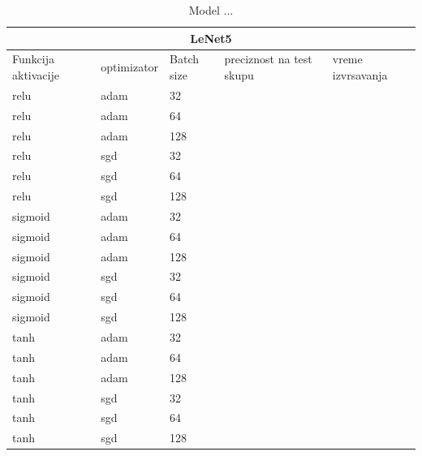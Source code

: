 \documentclass[a4paper]{article}
\begin{document}
\begin{table}[h!]
\begin{center}
\caption{Model ...}
\begin{tabular}{ |p{1.5cm}||p{2cm}|p{1cm}|p{1.5cm}|p{1cm}| }
 \hline
 \multicolumn{5}{|c|}{LeNet5} \\
 \hline
 Funkcija aktivacije & optimizator & Batch size & preciznost na test skupu & vreme izvrsavanja\\
 \hline
 relu    & adam & 32  &   &   \\
 relu    & adam & 64  &   &   \\
 relu    & adam & 128 &   &   \\
 relu    & sgd  & 32  &   &   \\
 relu    & sgd  & 64  &   &   \\
 relu    & sgd  & 128 &   &   \\
 sigmoid & adam & 32  &   &   \\
 sigmoid & adam & 64  &   &   \\
 sigmoid & adam & 128 &   &   \\
 sigmoid & sgd  & 32  &   &   \\
 sigmoid & sgd  & 64  &   &   \\
 sigmoid & sgd  & 128 &   &   \\
 tanh    & adam & 32  &   &   \\
 tanh    & adam & 64  &   &   \\
 tanh    & adam & 128 &   &   \\
 tanh    & sgd  & 32  &   &   \\
 tanh    & sgd  & 64  &   &   \\
 tanh    & sgd  & 128 &   &   \\

 \hline
\end{tabular}
\end{center}
\end{table}
\end{document}

